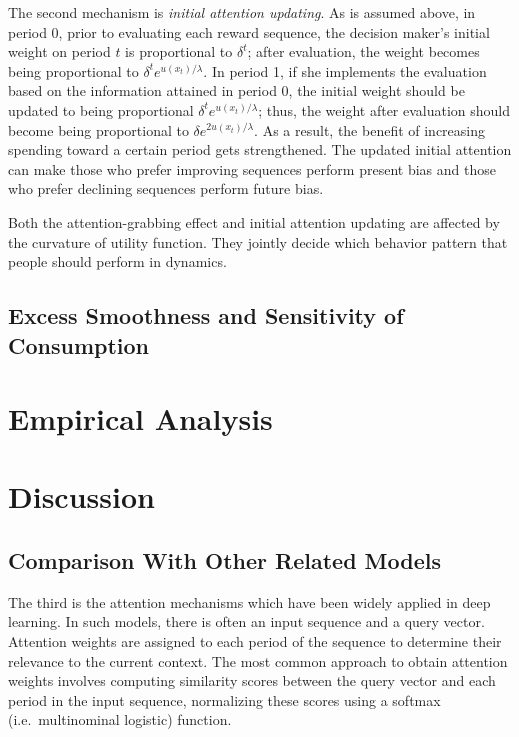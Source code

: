 \documentclass[
  12pt,
]{article}
\begin{document}
The second mechanism is \emph{initial attention updating}. As is assumed
above, in period 0, prior to evaluating each reward sequence, the
decision maker's initial weight on period \(t\) is proportional to
\(\delta^t\); after evaluation, the weight becomes being proportional to
\(\delta^t e^{u(x_t)/\lambda}\). In period 1, if she implements the
evaluation based on the information attained in period 0, the initial
weight should be updated to being proportional
\(\delta^t e^{u(x_t)/\lambda}\); thus, the weight after evaluation
should become being proportional to \(\delta e^{2u(x_t)/\lambda}\). As a
result, the benefit of increasing spending toward a certain period gets
strengthened. The updated initial attention can make those who prefer
improving sequences perform present bias and those who prefer declining
sequences perform future bias.

Both the attention-grabbing effect and initial attention updating are
affected by the curvature of utility function. They jointly decide which
behavior pattern that people should perform in dynamics.

\hypertarget{excess-smoothness-and-sensitivity-of-consumption}{%
\subsection{Excess Smoothness and Sensitivity of
Consumption}\label{excess-smoothness-and-sensitivity-of-consumption}}

\hypertarget{empirical-analysis}{%
\section{Empirical Analysis}\label{empirical-analysis}}

\hypertarget{discussion}{%
\section{Discussion}\label{discussion}}

\hypertarget{comparison-with-other-related-models}{%
\subsection{Comparison With Other Related
Models}\label{comparison-with-other-related-models}}

The third is the attention mechanisms which have been widely applied in
deep learning. In such models, there is often an input sequence and a
query vector. Attention weights are assigned to each period of the
sequence to determine their relevance to the current context. The most
common approach to obtain attention weights involves computing
similarity scores between the query vector and each period in the input
sequence, normalizing these scores using a softmax (i.e.~multinominal
logistic) function.
\end{document}
